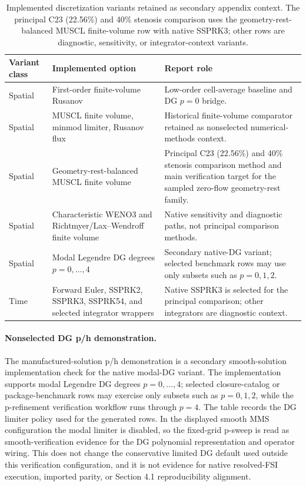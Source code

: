 \begin{table}[!htb]
    \centering
    \scriptsize
    \caption{Implemented discretization variants retained as secondary appendix
    context. The principal C23 (22.56\%) and 40\% stenosis comparison uses the
    geometry-rest-balanced MUSCL finite-volume row with native SSPRK3; other
    rows are diagnostic, sensitivity, or integrator-context variants.}
    \label{tab:implemented-discretization-surface}
    \begin{tabularx}{\textwidth}{@{}p{}p{}X@{}}
        \toprule
        \textbf{Variant class} & \textbf{Implemented option} & \textbf{Report role} \\
        \midrule
        Spatial & First-order finite-volume Rusanov & Low-order cell-average baseline and DG $p=0$ bridge. \\
        Spatial & MUSCL finite volume, minmod limiter, Rusanov flux & Historical finite-volume comparator retained as nonselected numerical-methods context. \\
        Spatial & Geometry-rest-balanced MUSCL finite volume & Principal C23 (22.56\%) and 40\% stenosis comparison method and main verification target for the sampled zero-flow geometry-rest family. \\
        Spatial & Characteristic WENO3 and Richtmyer/Lax--Wendroff finite volume & Native sensitivity and diagnostic paths, not principal comparison methods. \\
        Spatial & Modal Legendre DG degrees $p=0,\ldots,4$ & Secondary native-DG variant; selected benchmark rows may use only subsets such as $p=0,1,2$. \\
        Time & Forward Euler, SSPRK2, SSPRK3, SSPRK54, and selected integrator wrappers & Native SSPRK3 is selected for the principal comparison; other integrators are diagnostic context. \\
        \bottomrule
    \end{tabularx}
\end{table}

\paragraph{Nonselected DG p/h demonstration.}
The manufactured-solution p/h demonstration is a secondary smooth-solution
implementation check for the native modal-DG variant. The implementation
supports modal Legendre DG degrees $p=0,\ldots,4$; selected closure-catalog or
package-benchmark rows may exercise only subsets such as $p=0,1,2$, while the
p-refinement verification workflow runs through $p=4$. The table records the
DG limiter policy used for the generated rows. In the displayed smooth MMS
configuration the modal limiter is disabled, so the fixed-grid p-sweep is read
as smooth-verification evidence for the DG polynomial representation and
operator wiring. This does not change the conservative limited DG default used
outside this verification configuration, and it is not evidence for native
resolved-FSI execution, imported parity, or Section 4.1 reproducibility
alignment.

